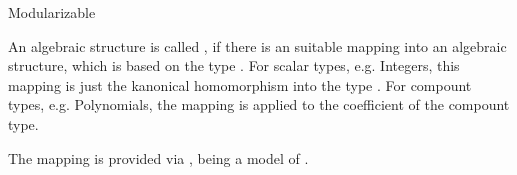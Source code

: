 \begin{ccRefConcept}{Modularizable}

\ccDefinition

An algebraic structure is called \ccRefName, if there is an suitable mapping into 
an algebraic structure, which is based on the type . 
For scalar types, e.g. Integers, this mapping is just the kanonical homomorphism 
into the type . For compount types, e.g. Polynomials, 
the mapping is applied to the coefficient of the compount type. 

The mapping is provided via , 
being a model of .

\ccSeeAlso
{}\\
\\

\end{ccRefConcept}